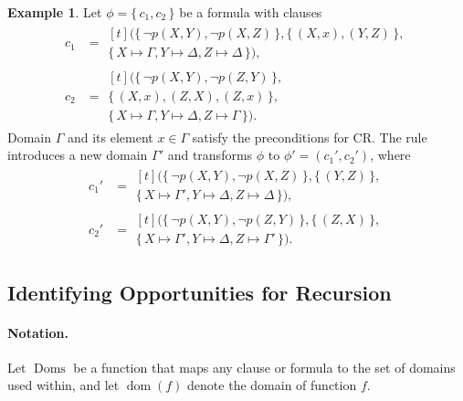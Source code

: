 \documentclass{article}
\theoremstyle{definition}
\newtheorem{example}{Example}
\DeclareMathOperator{\dom}{dom}
\DeclareMathOperator{\Doms}{Doms}
\begin{document}
\begin{example}
  Let $\phi = \{\, c_1, c_2 \,\}$ be a formula with clauses
  \begin{align*}
    c_1 &=
          \begin{multlined}[t]
            (\{\, \neg p(X, Y), \neg p(X, Z) \,\}, \{\, (X, x), (Y, Z) \,\}, \\
            \{\, X \mapsto \Gamma, Y \mapsto \Delta, Z \mapsto \Delta \,\}),
          \end{multlined}\\
    c_2 &=
          \begin{multlined}[t]
            (\{\, \neg p(X, Y), \neg p(Z, Y) \,\}, \\
            \{\, (X, x), (Z, X), (Z, x) \,\}, \\
            \{\, X \mapsto \Gamma, Y \mapsto \Delta, Z \mapsto \Gamma \,\}).
          \end{multlined}
  \end{align*}
  Domain $\Gamma$ and its element $x \in \Gamma$ satisfy the preconditions for
  CR\@. The rule introduces a new domain $\Gamma'$ and transforms $\phi$ to
  $\phi' = (c_1', c_2')$, where
  \begin{align*}
    c_1' &=
           \begin{multlined}[t]
             (\{\, \neg p(X, Y), \neg p(X, Z) \,\}, \{\, (Y, Z) \,\}, \\
             \{\, X \mapsto \Gamma', Y \mapsto \Delta, Z \mapsto \Delta \,\}),
           \end{multlined} \\
    c_2' &=
           \begin{multlined}[t]
             (\{\, \neg p(X, Y), \neg p(Z, Y) \,\}, \{\, (Z, X) \,\}, \\
             \{\, X \mapsto \Gamma', Y \mapsto \Delta, Z \mapsto \Gamma' \,\}).
           \end{multlined}
  \end{align*}
\end{example}

\subsection{Identifying Opportunities for Recursion}\label{sec:ref}

\paragraph{Notation.}
Let $\Doms$ be a function that maps any clause or formula to the set of domains
used within, and let $\dom(f)$ denote the domain of function $f$.
\end{document}
